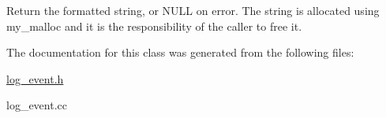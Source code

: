 Return the formatted string, or N\+U\+LL on error. The string is allocated using my\+\_\+malloc and it is the responsibility of the caller to free it. 

The documentation for this class was generated from the following files\+:\begin{DoxyCompactItemize}
\item 
\mbox{\hyperlink{log__event_8h}{log\+\_\+event.\+h}}\item 
log\+\_\+event.\+cc\end{DoxyCompactItemize}
